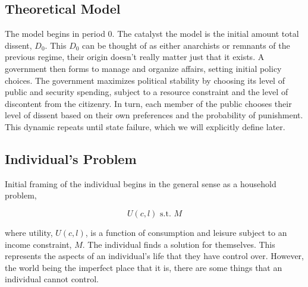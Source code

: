 \documentclass[12pt]{article}
\begin{document}
\begin{spacing}{1.5}

\section{Theoretical Model}

The model begins in period 0. The catalyst the model is the initial amount total dissent, $D_0$. This $D_0$ can be thought of as either anarchists or remnants of the previous regime, their origin doesn't really matter just that it exists. A government then forms to manage and organize affairs, setting initial policy choices. The government maximizes political stability by choosing its level of public and security spending, subject to a resource constraint and the level of discontent from the citizenry. In turn, each member of the public chooses their level of dissent based on their own preferences and the probability of punishment. This dynamic repeats until state failure, which we will explicitly define later. 
 
\subsection{Individual's Problem}
Initial framing of the individual begins in the general sense as a household problem, 

\begin{equation}
	U(c,l) \text{ s.t. } M
\end{equation}

\noindent where utility, $U(c,l)$, is a function of consumption and leisure subject to an income constraint, $M$. The individual finds a solution for themselves. This represents the aspects of an individual's life that they have control over. However, the world being the imperfect place that it is, there are some things that an individual cannot control.  


\end{spacing}
\end{document}

